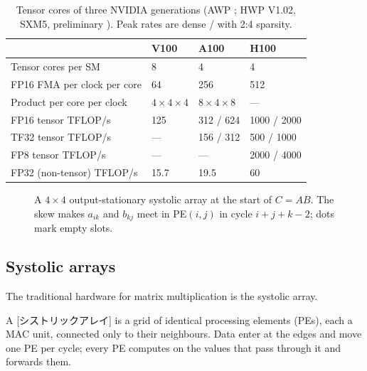 \documentclass[../main.tex]{subfiles}
\begin{document}
\begin{table}[htbp]
  \centering
  \caption{Tensor cores of three NVIDIA generations (AWP
    \cite{nvidia2020ampere}; HWP V1.02, SXM5, preliminary
    \cite{nvidia2022hopper}).  Peak rates are dense / with 2:4
    sparsity.}
  \label{tab:l12-tensor-cores}
  \setlength{\tabcolsep}{4pt}
  \begin{tabular}{>{\raggedright\arraybackslash}p{46mm}lll}
    \toprule
    & V100 & A100 & H100 \\
    \midrule
    Tensor cores per SM & 8 & 4 & 4 \\
    FP16 FMA per clock per core & 64 & 256 & 512 \\
    Product per core per clock & $4 \times 4 \times 4$ & $8 \times 4 \times 8$ & --- \\
    \addlinespace
    FP16 tensor TFLOP/s & 125 & 312 / 624 & 1000 / 2000 \\
    TF32 tensor TFLOP/s & --- & 156 / 312 & 500 / 1000 \\
    FP8 tensor TFLOP/s & --- & --- & 2000 / 4000 \\
    FP32 (non-tensor) TFLOP/s & 15.7 & 19.5 & 60 \\
    \bottomrule
  \end{tabular}
\end{table}

\begin{figure}[tb]
  \centering
  
  \caption{A $4 \times 4$ output-stationary systolic array at the start of
    $C = AB$.  The skew makes $a_{ik}$ and $b_{kj}$ meet in PE$(i,j)$ in
    cycle $i + j + k - 2$; dots mark empty slots.}
  \label{fig:l12-systolic}
\end{figure}

\subsection{Systolic arrays}

The traditional hardware for matrix multiplication is the systolic
array.

\begin{definition}
  A [シストリックアレイ] is a grid of identical
  processing elements (PEs), each a MAC unit, connected only to their
  neighbours.  Data enter at the edges and move one PE per cycle; every
  PE computes on the values that pass through it and forwards
  them.
\end{definition}
\end{document}
